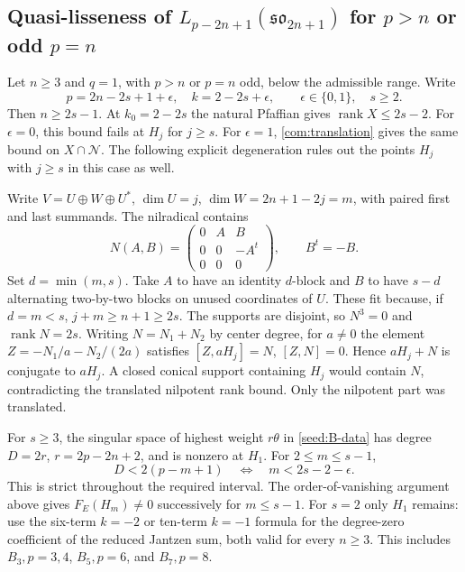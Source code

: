 \documentclass[11pt,a4paper]{amsart}
\numberwithin{equation}{section}
\theoremstyle{definition}
\theoremstyle{remark}
\newcommand{\N}{\mathcal N}
\newcommand{\sog}{\mathfrak{so}}
\newcommand{\rank}{\operatorname{rank}}
\begin{document}
\subsection{\texorpdfstring{Quasi-lisseness of $L_{p-2n+1}(\sog_{2n+1})$ for $p>n$ or odd $p=n$}{Quasi-lisseness of L(p-2n+1)(so(2n+1)) for p greater than n or odd p=n}}\label{B:upper-integral}
Let $n\ge3$ and $q=1$, with $p>n$ or $p=n$ odd, below the
admissible range. Write
$$
 p=2n-2s+1+\epsilon,\quad k=2-2s+\epsilon,
 \qquad\epsilon\in\{0,1\},\quad s\ge2.
$$
Then $n\ge2s-1$. At $k_0=2-2s$ the natural Pfaffian gives
$\rank X\le2s-2$. For $\epsilon=0$, this bound fails at $H_j$ for $j\ge s$.
For $\epsilon=1$, \cref{com:translation} gives the same bound on
$X\cap\N$. The following explicit degeneration rules out the points
$H_j$ with $j\ge s$ in this case as well.

Write $V=U\oplus W\oplus U^*$, $\dim U=j$, $\dim W=2n+1-2j=m$,
with paired first and last summands. The nilradical contains
$$
 N(A,B)=\begin{pmatrix}0&A&B\\0&0&-A^t\\0&0&0\end{pmatrix},
 \qquad B^t=-B.
$$
Set $d=\min(m,s)$. Take $A$ to have an identity $d$-block and $B$
to have $s-d$ alternating two-by-two blocks on unused coordinates of $U$.
These fit because, if $d=m<s$, $j+m\ge n+1\ge2s$.
The supports are disjoint, so $N^3=0$ and $\rank N=2s$.
Writing $N=N_1+N_2$ by center degree, for $a\ne0$ the element
$Z=-N_1/a-N_2/(2a)$ satisfies
$[Z,aH_j]=N$, $[Z,N]=0$. Hence $aH_j+N$ is conjugate to $aH_j$.
A closed conical support containing $H_j$ would contain $N$, contradicting
the translated nilpotent rank bound. Only the nilpotent part was translated.

For $s\ge3$, the singular space of highest weight $r\theta$ in \cref{seed:B-data} has degree
$D=2r$, $r=2p-2n+2$, and is nonzero at $H_1$. For
$2\le m\le s-1$,
$$
 D<2(p-m+1)\quad\Longleftrightarrow\quad m<2s-2-\epsilon.
$$
This is strict throughout the required interval. The order-of-vanishing
argument above gives $F_E(H_m)\ne0$ successively for $m\le s-1$. For $s=2$
only $H_1$ remains: use the six-term $k=-2$ or ten-term $k=-1$
formula for the degree-zero coefficient of the reduced Jantzen sum, both valid for every $n\ge3$.
This includes $B_3,p=3,4$, $B_5,p=6$, and $B_7,p=8$.
\end{document}

